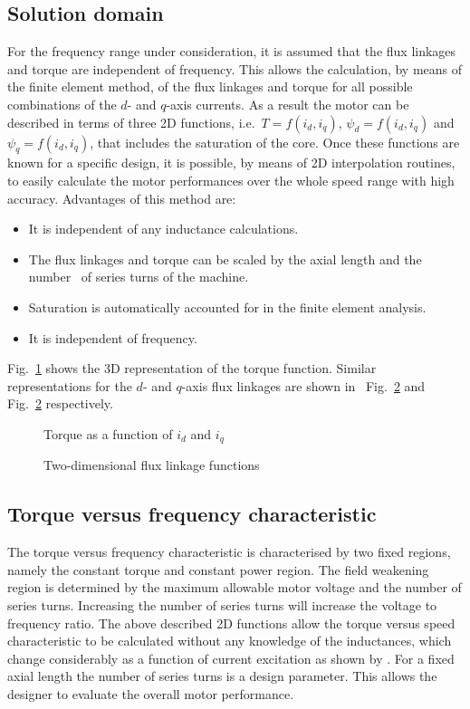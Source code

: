 \subsection{Solution domain}
For the frequency range under consideration, it is assumed that the flux linkages and torque are independent of frequency. This allows the calculation, by means of the finite element method, of the flux linkages and torque for all possible combinations of the $d$- and $q$-axis currents. As a result the motor can be described in terms of three 2D functions, i.e.~$T= f(i_{d},i_{q})$, $\psi_{d} = f(i_{d},i_{q})$ and $\psi_{q} = f(i_{d},i_{q})$, that includes the saturation of the core. Once these functions are known for a specific design, it is possible, by means of 2D interpolation routines, to easily calculate the motor performances over the whole speed range with high accuracy. Advantages of this method are:
\begin{itemize}
  \item It is independent of any inductance calculations.
  \item The flux linkages and torque can be scaled by the axial length and the number~%
  of series turns of the machine.
  \item Saturation is automatically accounted for in the finite element analysis.
  \item It is independent of frequency.
\end{itemize}
Fig.~\ref{fig:2d_torque} shows the 3D representation of the torque function. Similar representations for the $d$- and $q$-axis flux linkages are shown in~%
Fig.~\ref{fig:Main_2D_psi} and~%
Fig.~\ref{fig:Main_2D_psi} respectively.
\begin{figure}[htbp]
  \centering
    
  \caption{Torque as a function of $i_d$ and $i_q$}
  \label{fig:2d_torque}
\end{figure}
\begin{figure}[htbp]
  \centering
  
  \vspace{0.2cm}
  
  \caption{Two-dimensional flux linkage functions}
  \label{fig:Main_2D_psi}
\end{figure}

\subsection{Torque versus frequency characteristic}\label{subsec:t_vs_f}
The torque versus frequency characteristic is characterised by two fixed regions, namely the constant torque and constant power region. The field weakening region is determined by the maximum allowable motor voltage and the number of series turns. Increasing the number of series turns will increase the voltage to frequency ratio. The above described 2D functions allow the torque versus speed characteristic to be
calculated without any knowledge of the inductances, which change considerably as a function of current excitation as shown by \cite{bech_2005}. For a fixed axial length the number of series turns is a design parameter. This allows the designer to evaluate the overall motor performance.

